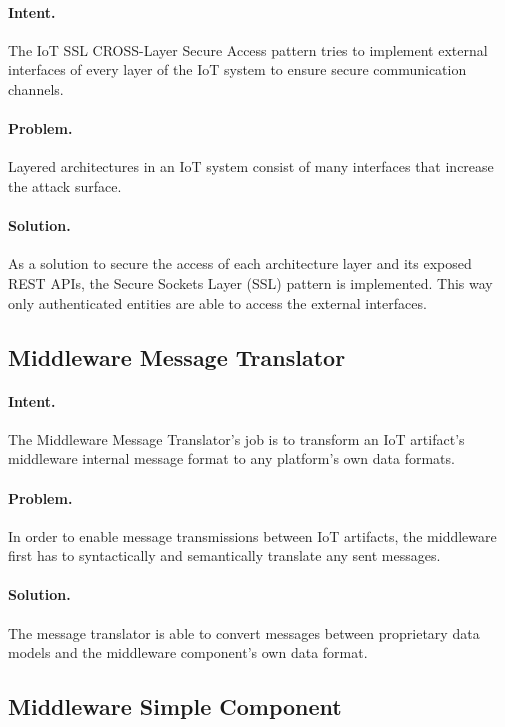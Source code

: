 \paragraph{\textbf{Intent.}} The IoT SSL CROSS-Layer Secure Access pattern tries to implement external interfaces of every layer of the IoT system to ensure secure communication channels.

\paragraph{\textbf{Problem.}} Layered architectures in an IoT system consist of many interfaces that increase the attack surface.

\paragraph{\textbf{Solution.}} As a solution to secure the access of each architecture layer and its exposed REST APIs, the Secure Sockets Layer (SSL) pattern is implemented. This way only authenticated entities are able to access the external interfaces.


\subsection{Middleware Message Translator~\cite{Tkaczyk2018}} 
\label{p:msgtranslator}

\paragraph{\textbf{Intent.}} The Middleware Message Translator's job is to transform an IoT artifact's middleware internal message format to any platform's own data formats.

\paragraph{\textbf{Problem.}} In order to enable message transmissions between IoT artifacts, the middleware first has to syntactically and semantically translate any sent messages.

\paragraph{\textbf{Solution.}} The message translator is able to convert messages between proprietary data models and the middleware component's own data format.


\subsection{Middleware Simple Component~\cite{Tkaczyk2018}} 
\label{p:middleware}

